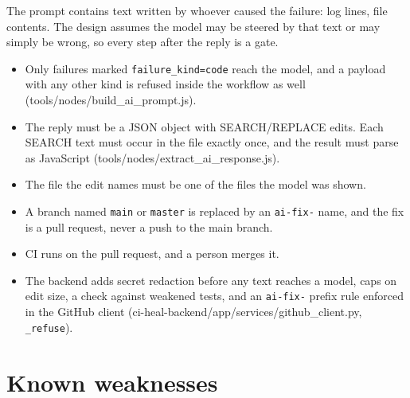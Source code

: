 \documentclass[11pt,a4paper]{report}
\begin{document}
The prompt contains text written by whoever caused the failure: log lines, file contents. The design assumes the model may be steered by that text or may simply be wrong, so every step after the reply is a gate.

\begin{itemize}[leftmargin=*,itemsep=2pt]
\item Only failures marked \texttt{failure\_\allowbreak{}kind=code} reach the model, and a payload with any other kind is refused inside the workflow as well (tools/nodes/build\_ai\_prompt.js).
\item The reply must be a JSON object with SEARCH/REPLACE edits. Each SEARCH text must occur in the file exactly once, and the result must parse as JavaScript (tools/nodes/extract\_ai\_response.js).
\item The file the edit names must be one of the files the model was shown.
\item A branch named \texttt{main} or \texttt{master} is replaced by an \texttt{ai-\allowbreak{}fix-\allowbreak{}} name, and the fix is a pull request, never a push to the main branch.
\item CI runs on the pull request, and a person merges it.
\item The backend adds secret redaction before any text reaches a model, caps on edit size, a check against weakened tests, and an \texttt{ai-\allowbreak{}fix-\allowbreak{}} prefix rule enforced in the GitHub client (ci-heal-backend/app/services/github\_client.py, \texttt{\_\allowbreak{}refuse}).
\end{itemize}

\section{Known weaknesses}
\end{document}
